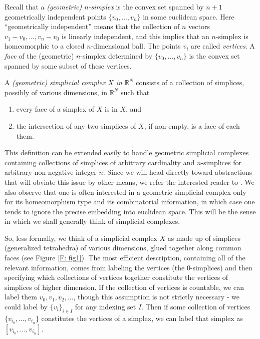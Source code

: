 \documentclass[12pt]{article}
\theoremstyle{plain}
\theoremstyle{definition}
\theoremstyle{remark}
\newcommand{\R}{\mathbb{R}}
\begin{document}
Recall that a \emph{(geometric) $n$-simplex} is the convex set spanned by $n+1$ geometrically independent points $\{v_0,\ldots, v_n\}$ in some euclidean space. Here ``geometrically independent'' means that the collection of $n$ vectors $v_1-v_0,\ldots, v_n-v_0$ is linearly independent, and this implies that an $n$-simplex is homeomorphic to a closed $n$-dimensional ball. The points $v_i$ are called \emph{vertices}. A \emph{face} of the (geometric) $n$-simplex determined by $\{v_0,\ldots, v_n\}$ is the convex set spanned by some subset of these vertices. 

A \emph{(geometric) simplicial complex $X$ in $\R^N$} consists of a collection of simplices, possibly of various dimensions, in $\R^N$ such that \begin{enumerate}
\item every face of a simplex of $X$ is in $X$, and
\item the intersection of any two simplices of $X$, if non-empty, is a face of each them.
\end{enumerate}
This definition can be extended easily to handle geometric simplicial complexes containing collections of simplices of arbitrary cardinality and $n$-simplices for arbitrary non-negative integer $n$. Since we will head directly toward abstractions that will obviate this issue by other means, we refer the interested reader to \cite[Section 2]{MK}. We also observe that one is often interested in a geometric simplicial complex only for its homeomorphism type and its combinatorial information, in which case one tends to ignore the precise embedding into euclidean space. This will be the sense in which we shall generally think of simplicial complexes. 



So, less formally, we think of a simplicial complex $X$ as made up of simplices (generalized tetrahedra) of various dimensions, glued together along common faces (see Figure \ref{F: fig1}). The most efficient description, containing all of the relevant information, comes from labeling the vertices (the $0$-simplices) and then specifying which collections of vertices together constitute the vertices of simplices of higher dimension. 
If  the collection of vertices is countable,  we can label them $v_0, v_1,v_2,\ldots$, though this assumption is not strictly necessary - we could label by $\{v_i\}_{i\in I}$ for any indexing set $I$. Then if some collection of vertices $\{v_{i_0},\ldots, v_{i_n}\}$ constitutes the vertices of a simplex, we can label that simplex as $[v_{i_0},\ldots, v_{i_n}]$. 
\end{document}
